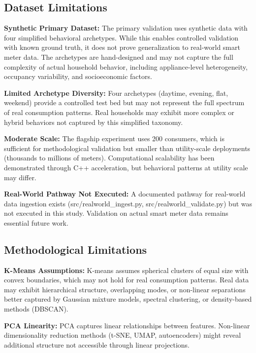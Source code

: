 \documentclass[11pt,a4paper]{article}
\begin{document}
\subsection{Dataset Limitations}

\textbf{Synthetic Primary Dataset:} The primary validation uses synthetic data with four simplified behavioral archetypes. While this enables controlled validation with known ground truth, it does not prove generalization to real-world smart meter data. The archetypes are hand-designed and may not capture the full complexity of actual household behavior, including appliance-level heterogeneity, occupancy variability, and socioeconomic factors.

\textbf{Limited Archetype Diversity:} Four archetypes (daytime, evening, flat, weekend) provide a controlled test bed but may not represent the full spectrum of real consumption patterns. Real households may exhibit more complex or hybrid behaviors not captured by this simplified taxonomy.

\textbf{Moderate Scale:} The flagship experiment uses 200 consumers, which is sufficient for methodological validation but smaller than utility-scale deployments (thousands to millions of meters). Computational scalability has been demonstrated through C++ acceleration, but behavioral patterns at utility scale may differ.

\textbf{Real-World Pathway Not Executed:} A documented pathway for real-world data ingestion exists (src/realworld\_ingest.py, src/realworld\_validate.py) but was not executed in this study. Validation on actual smart meter data remains essential future work.

\subsection{Methodological Limitations}

\textbf{K-Means Assumptions:} K-means assumes spherical clusters of equal size with convex boundaries, which may not hold for real consumption patterns. Real data may exhibit hierarchical structure, overlapping modes, or non-linear separations better captured by Gaussian mixture models, spectral clustering, or density-based methods (DBSCAN).

\textbf{PCA Linearity:} PCA captures linear relationships between features. Non-linear dimensionality reduction methods (t-SNE, UMAP, autoencoders) might reveal additional structure not accessible through linear projections.
\end{document}
